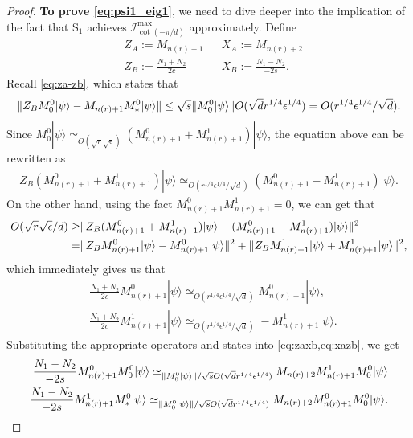 \documentclass[11pt,letterpaper]{article}
\newcommand{\ket}[1]{|#1\rangle}
\DeclarePairedDelimiter{\norm}{\lVert}{\rVert}
\newcommand{\1}{\mathbb{1}}
\newcommand{\nr}{n(r)}
\newcommand{\bS}{\mathrm{S}}
\newcommand{\I}{\mathcal{I}}
\newcommand{\se}{\sqrt{\epsilon}}
\newcommand{\qe}{\epsilon^{1/4}}
\newcommand{\sd}{\sqrt{d}}
\newcommand{\sr}{\sqrt{r}}
\newcommand{\qr}{r^{1/4}}
\newcommand{\appd}[1]{\simeq_{#1}}
\theoremstyle{definition}
\begin{document}
\begin{proof}
	\textbf{To prove \cref{eq:psi1_eig1}},
	we need to dive deeper into the implication of the fact that $\bS_1$ achieves $\I_{\cot(-\pi/d)}^{\max}$ approximately.
	Define
	\begin{align}
		&Z_A  := M_{\nr+1} && X_A := M_{\nr+2} \\
		&Z_B := \frac{N_1+N_2}{2c} && X_B := \frac{N_1-N_2}{-2s}.
	\end{align}
	Recall \cref{eq:za-zb}, which states that
	\begin{align*}
		\norm{Z_B M_0^0 \ket{\psi} - M_{\nr+1}M_\ast^0 \ket{\psi}} \leq 
		\sqrt{s}\norm{M_0^0 \ket{\psi}} O(\sd \qr \qe)
		= O(\qr \qe/ \sd ).
	\end{align*}
	Since $M_0^0 \ket{\psi} \appd{O(\sr \se)} (M_{\nr+1}^0 + M_{\nr+1}^1) \ket{\psi}$,
	the equation above can be rewritten as 
	\begin{align*}
		Z_B (M_{\nr+1}^0 + M_{\nr+1}^1) \ket{\psi} \appd{O(\qr \qe / \sd )} (M_{\nr+1}^0 - M_{\nr+1}^1) \ket{\psi}.
	\end{align*}
	On the other hand, using the fact $M_{\nr+1}^0 M_{\nr+1}^1 = 0$, we can get that
	\begin{align*}
		O(\sr \se /d) \geq &\norm{Z_B (M_{\nr+1}^0 + M_{\nr+1}^1) \ket{\psi} - (M_{\nr+1}^0 - M_{\nr+1}^1) \ket{\psi}}^2\\
		=&\norm{ Z_BM_{\nr+1}^0 \ket{\psi} - M_{\nr+1}^0\ket{\psi}}^2 + \norm{ Z_BM_{\nr+1}^1 \ket{\psi} + M_{\nr+1}^1\ket{\psi}}^2,
	\end{align*}
	which immediately gives us that 
	\begin{align}
		&\frac{N_1+N_2}{2c} M_{\nr+1}^0\ket{\psi} \appd{O( \qr \qe /\sd)} M_{\nr+1}^0 \ket{\psi},\\
		&\frac{N_1+N_2}{2c} M_{\nr+1}^1\ket{\psi} \appd{O( \qr \qe /\sd)} -M_{\nr+1}^1 \ket{\psi}.
	\end{align}
		Substituting the appropriate operators and states into \cref{eq:zaxb,eq:xazb}, we get
	\begin{align*}
		\frac{N_1-N_2}{-2s} M_{\nr+1}^0M_0^0 \ket{\psi} 
		\appd{\norm{M_0^0\ket{\psi}}/\sqrt{s} O(\sd \qr \qe)}M_{\nr+2} M_{\nr+1}^1M_0^0\ket{\psi}\\
		\frac{N_1 -N_2}{-2s} M_{\nr+1}^1M_\ast^0 \ket{\psi}  
		\appd{\norm{M_0^0 \ket{\psi}}/\sqrt{s}O(\sd \qr \qe)}M_{\nr+2} M_{\nr+1}^0 M_0^0 \ket{\psi}.

\end{align*}
\end{proof}
\end{document}
